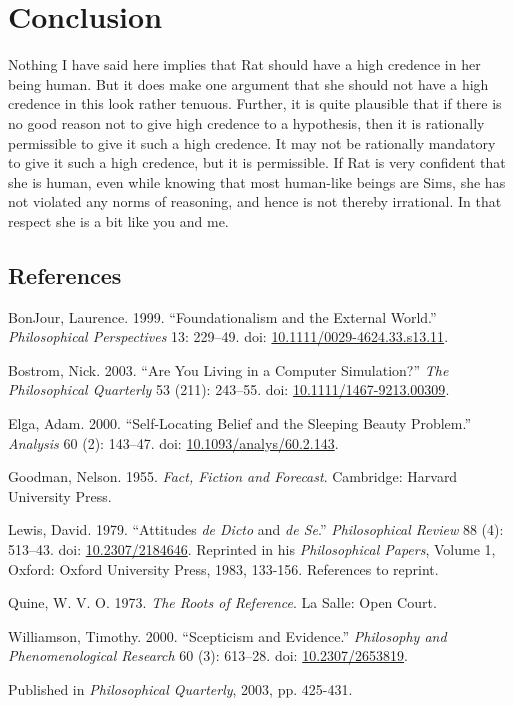 \documentclass[
  11pt,
  letterpaper,
  DIV=11,
  numbers=noendperiod,
  twoside]{scrartcl}
\newlength{\cslhangindent}
\newenvironment{CSLReferences}[2] %
 {\begin{list}{}{%
  \setlength{\itemindent}{0pt}
  \setlength{\leftmargin}{0pt}
  \setlength{\parsep}{0pt}
  \ifodd #1
   \setlength{\leftmargin}{\cslhangindent}
   \setlength{\itemindent}{-1\cslhangindent}
  \fi
  \setlength{\itemsep}{#2\baselineskip}}}
 {\end{list}}
\begin{document}
\section{Conclusion}\label{conclusion}

Nothing I have said here implies that Rat should have a high credence in
her being human. But it does make one argument that she should not have
a high credence in this look rather tenuous. Further, it is quite
plausible that if there is no good reason not to give high credence to a
hypothesis, then it is rationally permissible to give it such a high
credence. It may not be rationally mandatory to give it such a high
credence, but it is permissible. If Rat is very confident that she is
human, even while knowing that most human-like beings are Sims, she has
not violated any norms of reasoning, and hence is not thereby
irrational. In that respect she is a bit like you and me.

\subsection*{References}\label{references}

\protect{}\label{refs}
\begin{CSLReferences}{1}{0}
BonJour, Laurence. 1999. {``Foundationalism and the External World.''}
\emph{Philosophical Perspectives} 13: 229--49. doi:
\href{https://doi.org/10.1111/0029-4624.33.s13.11}{10.1111/0029-4624.33.s13.11}.

Bostrom, Nick. 2003. {``Are You Living in a Computer Simulation?''}
\emph{The Philosophical Quarterly} 53 (211): 243--55. doi:
\href{https://doi.org/10.1111/1467-9213.00309}{10.1111/1467-9213.00309}.

Elga, Adam. 2000. {``Self-Locating Belief and the Sleeping Beauty
Problem.''} \emph{Analysis} 60 (2): 143--47. doi:
\href{https://doi.org/10.1093/analys/60.2.143}{10.1093/analys/60.2.143}.

Goodman, Nelson. 1955. \emph{Fact, Fiction and Forecast}. Cambridge:
Harvard University Press.

Lewis, David. 1979. {``Attitudes \emph{de Dicto} and \emph{de Se}.''}
\emph{Philosophical Review} 88 (4): 513--43. doi:
\href{https://doi.org/10.2307/2184646}{10.2307/2184646}. Reprinted in
his \emph{Philosophical Papers}, Volume 1, Oxford: Oxford University
Press, 1983, 133-156. References to reprint.

Quine, W. V. O. 1973. \emph{The Roots of Reference}. La Salle: Open
Court.

Williamson, Timothy. 2000. {``{Scepticism and Evidence}.''}
\emph{Philosophy and Phenomenological Research} 60 (3): 613--28. doi:
\href{https://doi.org/10.2307/2653819}{10.2307/2653819}.

\end{CSLReferences}



\noindent Published in\emph{
Philosophical Quarterly}, 2003, pp. 425-431.
\end{document}
